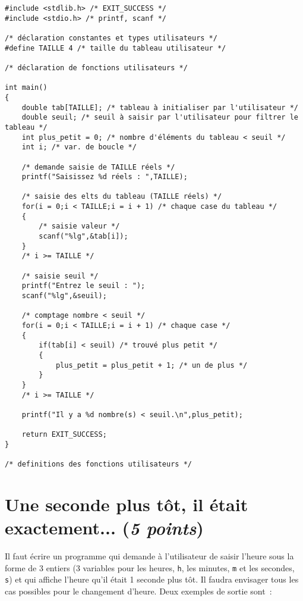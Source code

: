 \begin{correction}
\begin{small}
\begin{verbatim}
#include <stdlib.h> /* EXIT_SUCCESS */
#include <stdio.h> /* printf, scanf */

/* déclaration constantes et types utilisateurs */
#define TAILLE 4 /* taille du tableau utilisateur */

/* déclaration de fonctions utilisateurs */

int main()
{
    double tab[TAILLE]; /* tableau à initialiser par l'utilisateur */
    double seuil; /* seuil à saisir par l'utilisateur pour filtrer le tableau */
    int plus_petit = 0; /* nombre d'éléments du tableau < seuil */
    int i; /* var. de boucle */

    /* demande saisie de TAILLE réels */
    printf("Saisissez %d réels : ",TAILLE);

    /* saisie des elts du tableau (TAILLE réels) */
    for(i = 0;i < TAILLE;i = i + 1) /* chaque case du tableau */
    {
        /* saisie valeur */
        scanf("%lg",&tab[i]);
    }
    /* i >= TAILLE */
    
    /* saisie seuil */
    printf("Entrez le seuil : ");
    scanf("%lg",&seuil);
    
    /* comptage nombre < seuil */
    for(i = 0;i < TAILLE;i = i + 1) /* chaque case */
    {
        if(tab[i] < seuil) /* trouvé plus petit */
        {
            plus_petit = plus_petit + 1; /* un de plus */
        }
    }
    /* i >= TAILLE */

    printf("Il y a %d nombre(s) < seuil.\n",plus_petit);
  
    return EXIT_SUCCESS;
}

/* definitions des fonctions utilisateurs */
\end{verbatim}
\end{small}
\end{correction}
\section{Une seconde plus tôt, il était exactement... (\textit{5 points})}

Il faut écrire un programme qui demande à l'utilisateur de saisir l'heure sous la forme de 3 entiers (3 variables pour les heures, \verb|h|, les minutes,
\verb|m| et les secondes, \verb|s|) et qui affiche l'heure qu'il était 1
seconde plus tôt. Il faudra envisager tous les
cas possibles pour le changement d'heure. Deux exemples de sortie sont~:

